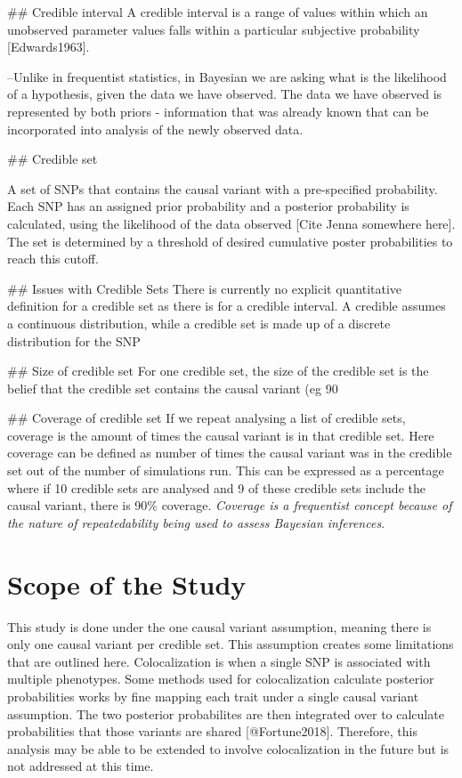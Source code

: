 ## Credible interval
A credible interval is a range of values within which an unobserved parameter values falls within a particular subjective probability [Edwards1963]. 


--Unlike in frequentist statistics, in Bayesian we are asking what is the likelihood of a hypothesis, given the data we have observed. The data we have observed is represented by both priors - information that was already known that can be incorporated into analysis of the newly observed data. 

## Credible set

A set of SNPs that contains the causal variant with a pre-specified probability. Each SNP has an assigned prior probability and a posterior probability is calculated, using the likelihood of the data observed [Cite Jenna somewhere here]. The set is determined by a threshold of desired cumulative poster probabilities to reach this cutoff. 

## Issues with Credible Sets 
There is currently no explicit quantitative definition for a credible set as there is for a credible interval. A credible assumes a continuous distribution, while a credible set is made up of a discrete distribution for the SNP 

## Size of credible set
For one credible set, the size of the credible set is the belief that the credible set contains the causal variant (eg 90%

## Coverage of credible set
If we repeat analysing a list of credible sets, coverage is the amount of times the causal variant is in that credible set. Here coverage can be defined as number of times the causal variant was in the credible set out of the number of simulations run. This can be expressed as a percentage where if 10 credible sets are analysed and 9 of these credible sets include the causal variant, there is 90\% coverage. \emph{Coverage is a frequentist concept because of the nature of repeatedability being used to assess Bayesian inferences}. 



\section{Scope of the Study}

This study is done under the one causal variant assumption, meaning there is only one causal variant per credible set. This assumption creates some limitations that are outlined here. 
Colocalization is when a single SNP is associated with multiple phenotypes. Some methods used for colocalization calculate posterior probabilities works by fine mapping each trait under a single causal variant assumption. The two posterior probabilites are then integrated over to calculate probabilities that those variants are shared [@Fortune2018]. Therefore, this analysis may be able to be extended to involve colocalization in the future but is not addressed at this time.  

